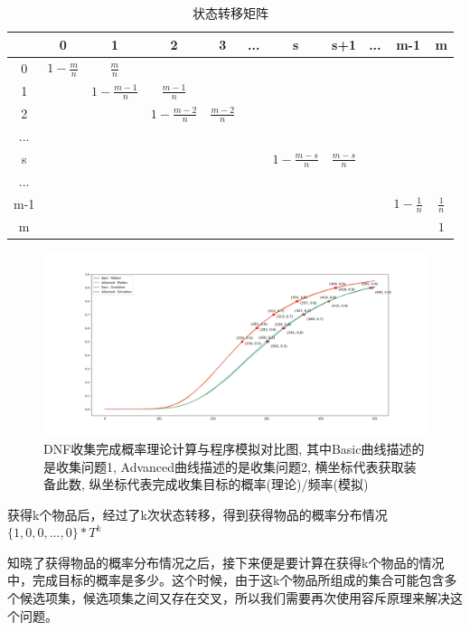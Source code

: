 \documentclass[10pt,journal,compsoc]{IEEEtran}
\begin{document}
  \begin{table}[]
    \centering
    \caption{状态转移矩阵}
    \label{tab:markov}
    \begin{tabular}{c|cccccccccc}
        & 0 & 1 & 2 & 3 & ... & s & s+1 & ... & m-1 & m \\ \hline
    0   & $1-\frac{m}{n}$ & $\frac{m}{n}$ &   &   &     &   &     &     &     &   \\
    1   &   & $1-\frac{m-1}{n}$ & $\frac{m-1}{n}$ &   &     &   &     &     &     &   \\
    2   &   &   & $1-\frac{m-2}{n}$ & $\frac{m-2}{n}$ &     &   &     &     &     &   \\
    ... &   &   &   &   &     &   &     &     &     &   \\
    s   &   &   &   &   &     & $1-\frac{m-s}{n}$ & $\frac{m-s}{n}$ &     &     &   \\
    ... &   &   &   &   &     &   &     &     &     &   \\
    m-1 &   &   &   &   &     &   &     &     &  $1-\frac{1}{n}$  & $\frac{1}{n}$ \\
    m   &   &   &   &   &     &   &     &     &     &  $1$
    \end{tabular}
  \end{table}

  \begin{figure}[!ht]
    \centering
    \includegraphics[width=45pc]{img/everything_about_dnf.png}
    \caption{DNF收集完成概率理论计算与程序模拟对比图, 其中Basic曲线描述的是收集问题1, Advanced曲线描述的是收集问题2, 横坐标代表获取装备此数, 纵坐标代表完成收集目标的概率(理论)/频率(模拟)}
    \label{fig:dnf_comprehensive}
  \end{figure}
  
  获得k个物品后，经过了k次状态转移，得到获得物品的概率分布情况$\{1,0,0,...,0\}*T^k$

  知晓了获得物品的概率分布情况之后，接下来便是要计算在获得k个物品的情况中，完成目标的概率是多少。这个时候，由于这k个物品所组成的集合可能包含多个候选项集，候选项集之间又存在交叉，所以我们需要再次使用容斥原理来解决这个问题。
  
\end{document}
